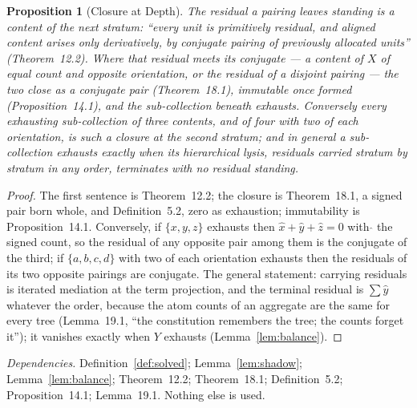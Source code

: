 \documentclass[pdflatex,sn-mathphys-num]{sn-jnl}
\theoremstyle{thmstyleone}%
\newtheorem{proposition}[theorem]{Proposition}
\theoremstyle{thmstyletwo}%
\theoremstyle{thmstylethree}%
\newtheorem{proposition}[theorem]{Proposition}
\newcommand{\q}[1]{``#1''}        %
\newcommand{\deps}[1]{\par\begin{sloppypar}\noindent\emph{Dependencies.} #1 Nothing else is used.\end{sloppypar}}
\begin{document}
\begin{proposition}[Closure at Depth]\label{prop:closure}
The residual a pairing leaves standing is a content of the next stratum: \q{every unit is primitively residual, and aligned content arises only derivatively, by conjugate pairing of previously allocated units} (Theorem~12.2). Where that residual meets its conjugate --- a content of $X$ of equal count and opposite orientation, or the residual of a disjoint pairing --- the two close as a conjugate pair (Theorem~18.1), immutable once formed (Proposition~14.1), and the sub-collection beneath exhausts. Conversely every exhausting sub-collection of three contents, and of four with two of each orientation, is such a closure at the second stratum; and in general a sub-collection exhausts exactly when its hierarchical lysis, residuals carried stratum by stratum in any order, terminates with no residual standing.
\end{proposition}
\begin{proof}
The first sentence is Theorem~12.2; the closure is Theorem~18.1, a signed pair born whole, and Definition~5.2, zero as exhaustion; immutability is Proposition~14.1. Conversely, if $\{x,y,z\}$ exhausts then $\hat x+\hat y+\hat z=0$ with $\hat{}$ the signed count, so the residual of any opposite pair among them is the conjugate of the third; if $\{a,b,c,d\}$ with two of each orientation exhausts then the residuals of its two opposite pairings are conjugate. The general statement: carrying residuals is iterated mediation at the term projection, and the terminal residual is $\sum\hat y$ whatever the order, because the atom counts of an aggregate are the same for every tree (Lemma~19.1, \q{the constitution remembers the tree; the counts forget it}); it vanishes exactly when $Y$ exhausts (Lemma~\ref{lem:balance}).
\end{proof}
\deps{Definition~\ref{def:solved}; Lemma~\ref{lem:shadow}; Lemma~\ref{lem:balance}; Theorem~12.2; Theorem~18.1; Definition~5.2; Proposition~14.1; Lemma~19.1.}

\begin{table}[!htbp]
\centering\small
\caption{The solved state of the worked assertion $X=\{-7,-3,-2,5,8\}$ (Protocol~B.9). Entries are in units; $D-|S|$ is the matched count of a pair and $2|S|$ its residual. No entry of $S$ vanishes: no pair exhausts. The closures at the second stratum are \solvedClosures.}
\label{tab:solved}

\end{table}
\end{document}
